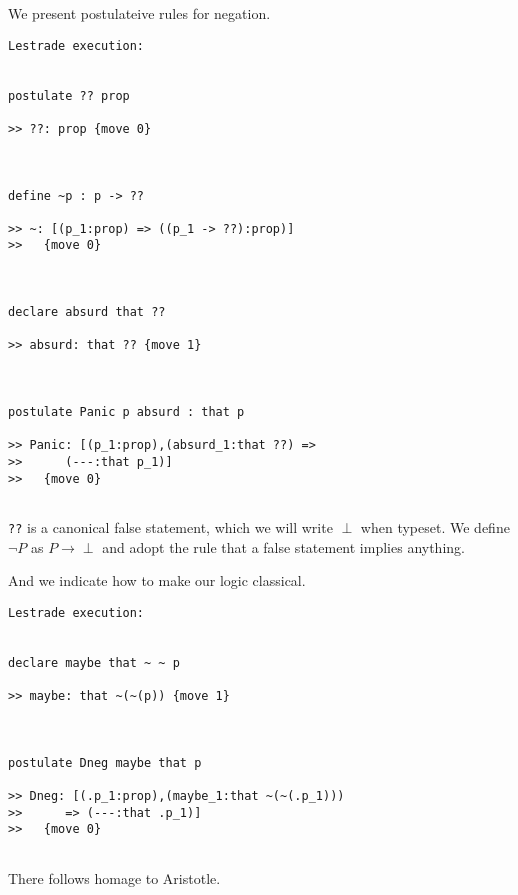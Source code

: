 \documentclass{article}
\begin{document}
We present postulateive rules for negation.

\begin{verbatim}Lestrade execution:


postulate ?? prop

>> ??: prop {move 0}



define ~p : p -> ??

>> ~: [(p_1:prop) => ((p_1 -> ??):prop)]
>>   {move 0}



declare absurd that ??

>> absurd: that ?? {move 1}



postulate Panic p absurd : that p

>> Panic: [(p_1:prop),(absurd_1:that ??) =>
>>      (---:that p_1)]
>>   {move 0}


\end{verbatim}

{\tt ??} is a canonical false statement, which we will write $\perp$ when typeset.  We define $\neg P$ as $P \rightarrow \perp$ and adopt the rule
that a false statement implies anything.

And we indicate how to make our logic classical.

\begin{verbatim}Lestrade execution:


declare maybe that ~ ~ p

>> maybe: that ~(~(p)) {move 1}



postulate Dneg maybe that p

>> Dneg: [(.p_1:prop),(maybe_1:that ~(~(.p_1)))
>>      => (---:that .p_1)]
>>   {move 0}


\end{verbatim}

There follows homage to Aristotle.
\end{document}
